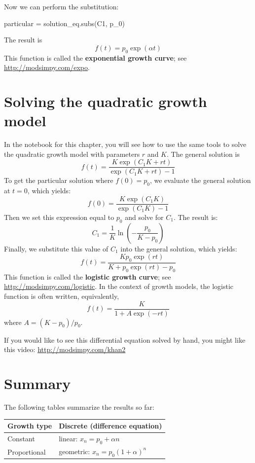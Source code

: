 \documentclass[12pt]{book}
\theoremstyle{exercise}
\begin{document}
Now we can perform the substitution:

\begin{python}
particular = solution_eq.subs(C1, p_0)
\end{python}

The result is 
%
\[ f{\left (t \right )} = p_{0} \exp(\alpha t) \]
%
This function is called the {\bf exponential growth curve}; see \url{http://modsimpy.com/expo}.



\section{Solving the quadratic growth model}

In the notebook for this chapter, you will see how to use the same tools to solve the quadratic growth model with parameters $r$ and $K$.  The general solution is
%
\[ f{\left (t \right )} = \frac{K \exp(C_{1} K + r t)}{\exp(C_{1} K + r t) - 1} \]
%
To get the particular solution where $f(0) = p_0$, we evaluate the general solution at $t=0$, which yields:
%
\[ f(0) = \frac{K \exp(C_{1} K)}{\exp(C_{1} K) - 1} \]
%
Then we set this expression equal to $p_0$ and solve for $C_1$.  The result is:
%
\[ C_1 = \frac{1}{K} \ln{\left (- \frac{p_{0}}{K - p_{0}} \right )} \]
%
Finally, we substitute this value of $C_1$ into the general solution, which yields:
%
\[ f(t) = \frac{K p_{0} \exp(r t)}{K + p_{0} \exp(r t) - p_{0}} \]
%
This function is called the {\bf logistic growth curve}; see \url{http://modsimpy.com/logistic}.  In the context of growth models, the logistic function is often written, equivalently,
%
\[ f(t) = \frac{K}{1 + A \exp(-rt)} \]
%
where $A = (K - p_0) / p_0$.

If you would like to see this differential equation solved by hand, you might like this video: \url{http://modsimpy.com/khan2}


\section{Summary}

The following tables summarize the results so far:

\begin{tabular}{l|l} 
\hline
Growth type         & Discrete (difference equation) \\ 
\hline 
Constant & linear: $x_n = p_0 + \alpha n$  \\ 
 
Proportional & geometric: $x_n = p_0(1+\alpha)^n$  \\ 

\end{tabular} 
\end{document}
